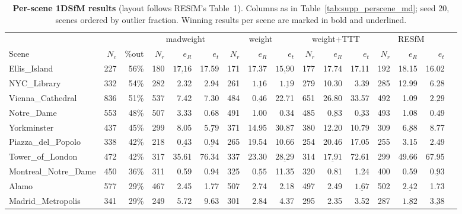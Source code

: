 \documentclass{article}
\begin{document}
\begin{table}[t]\centering\footnotesize
\caption{\textbf{Per-scene 1DSfM results} (layout follows RESfM's Table~1). Columns as in
Table~\ref{tab:supp_perscene_md}; seed 20, scenes ordered by outlier fraction. Winning results per scene are marked in bold and
underlined.}
\label{tab:supp_perscene_1dsfm}
\setlength{\tabcolsep}{2.5pt}%
\begin{tabular}{lrrrrrrrrrrrrrrr}
\toprule
& & & \multicolumn{3}{c}{madweight} & \multicolumn{3}{c}{weight} & \multicolumn{3}{c}{weight+TTT} & \multicolumn{3}{c}{RESfM}\\
\cmidrule(lr){4-6}\cmidrule(lr){7-9}\cmidrule(lr){10-12}\cmidrule(lr){13-15}
Scene & $N_c$ & \%out & $N_r$ & $e_R$ & $e_t$ & $N_r$ & $e_R$ & $e_t$ & $N_r$ & $e_R$ & $e_t$ & $N_r$ & $e_R$ & $e_t$\\
\midrule
Ellis\_Island & 227 & 56\% & 180 & $\underline{\mathbf{17.16}}$ & 17.59 & 171 & 17.37 & $\underline{\mathbf{15.90}}$ & 177 & 17.74 & 17.11 & 192 & 18.15 & 16.02\\
NYC\_Library & 332 & 54\% & 282 & 2.32 & 2.94 & 261 & $\underline{\mathbf{1.16}}$ & $\underline{\mathbf{1.19}}$ & 279 & 10.30 & 3.39 & 285 & 12.99 & 6.28\\
Vienna\_Cathedral & 836 & 51\% & 537 & 7.42 & 7.30 & 484 & $\underline{\mathbf{0.46}}$ & 22.71 & 651 & 26.80 & 33.57 & 492 & 1.09 & $\underline{\mathbf{2.29}}$\\
Notre\_Dame & 553 & 48\% & 507 & 3.33 & 0.68 & 491 & 1.00 & 0.34 & 485 & $\underline{\mathbf{0.83}}$ & $\underline{\mathbf{0.33}}$ & 493 & 1.08 & 0.49\\
Yorkminster & 437 & 45\% & 299 & 8.05 & $\underline{\mathbf{5.79}}$ & 371 & 14.95 & 30.87 & 380 & 12.20 & 10.79 & 309 & $\underline{\mathbf{6.88}}$ & 8.77\\
Piazza\_del\_Popolo & 338 & 42\% & 218 & $\underline{\mathbf{0.43}}$ & $\underline{\mathbf{0.94}}$ & 265 & 19.54 & 10.66 & 254 & 20.46 & 17.05 & 255 & 3.15 & 2.49\\
Tower\_of\_London & 472 & 42\% & 317 & 35.61 & 76.34 & 337 & 23.30 & $\underline{\mathbf{28.29}}$ & 314 & $\underline{\mathbf{17.91}}$ & 72.61 & 299 & 49.66 & 67.95\\
Montreal\_Notre\_Dame & 450 & 36\% & 311 & 0.59 & 0.94 & 325 & $\underline{\mathbf{0.55}}$ & 11.35 & 320 & 0.81 & 1.24 & 400 & 0.59 & $\underline{\mathbf{0.93}}$\\
Alamo & 577 & 29\% & 467 & 2.45 & 1.77 & 507 & 2.74 & 2.18 & 497 & 2.49 & $\underline{\mathbf{1.67}}$ & 502 & $\underline{\mathbf{2.42}}$ & 1.73\\
Madrid\_Metropolis & 341 & 29\% & 249 & 5.72 & 9.63 & 301 & 2.84 & 4.37 & 295 & 2.35 & 3.52 & 287 & $\underline{\mathbf{1.82}}$ & $\underline{\mathbf{3.38}}$\\
\bottomrule
\end{tabular}
\end{table}
\end{document}
